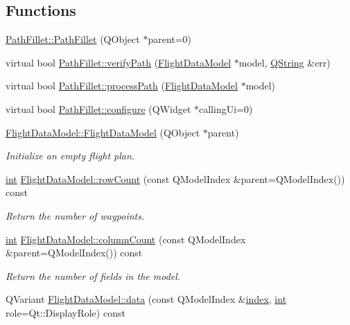 \subsection*{Functions}
\begin{DoxyCompactItemize}
\item 
\hyperlink{group___path_ga239ceff0ba45400e38be3f6641054f4c}{Path\-Fillet\-::\-Path\-Fillet} (Q\-Object $\ast$parent=0)
\item 
virtual bool \hyperlink{group___path_gaf69499501bc26d9321cb3edaabaf8b21}{Path\-Fillet\-::verify\-Path} (\hyperlink{class_flight_data_model}{Flight\-Data\-Model} $\ast$model, \hyperlink{group___u_a_v_objects_plugin_gab9d252f49c333c94a72f97ce3105a32d}{Q\-String} \&err)
\item 
virtual bool \hyperlink{group___path_ga1e32689145e646e17836652d3e90067c}{Path\-Fillet\-::process\-Path} (\hyperlink{class_flight_data_model}{Flight\-Data\-Model} $\ast$model)
\item 
virtual bool \hyperlink{group___path_ga4ab477c2642c61f1169c6aa07228ec64}{Path\-Fillet\-::configure} (Q\-Widget $\ast$calling\-Ui=0)
\item 
\hyperlink{group___path_ga777bf842aa77abc4db16f1275fac0df0}{Flight\-Data\-Model\-::\-Flight\-Data\-Model} (Q\-Object $\ast$parent)
\begin{DoxyCompactList}\small\item\em Initialize an empty flight plan. \end{DoxyCompactList}\item 
\hyperlink{ioapi_8h_a787fa3cf048117ba7123753c1e74fcd6}{int} \hyperlink{group___path_ga7c8a098e7b8a37867261f0036502a4fc}{Flight\-Data\-Model\-::row\-Count} (const Q\-Model\-Index \&parent=Q\-Model\-Index()) const 
\begin{DoxyCompactList}\small\item\em Return the number of waypoints. \end{DoxyCompactList}\item 
\hyperlink{ioapi_8h_a787fa3cf048117ba7123753c1e74fcd6}{int} \hyperlink{group___path_gab6781580d20ed0e89768eafa799856d4}{Flight\-Data\-Model\-::column\-Count} (const Q\-Model\-Index \&parent=Q\-Model\-Index()) const 
\begin{DoxyCompactList}\small\item\em Return the number of fields in the model. \end{DoxyCompactList}\item 
Q\-Variant \hyperlink{group___path_ga3314e011bb5ed88b34ab33bf8f94d41e}{Flight\-Data\-Model\-::data} (const Q\-Model\-Index \&\hyperlink{glext_8h_ab47dd9958bcadea08866b42bf358e95e}{index}, \hyperlink{ioapi_8h_a787fa3cf048117ba7123753c1e74fcd6}{int} role=Qt\-::\-Display\-Role) const 

\end{DoxyCompactItemize}
